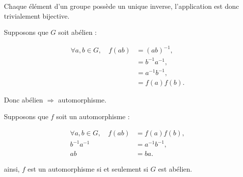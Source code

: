 Chaque élément d'un groupe possède un unique inverse, l'application est donc trivialement bijective.

Supposons que $G$ soit abélien :

\begin{align*}
    \forall a,b \in G,\quad f(ab) &= (ab)^{-1}, \\
    &= b^{-1} a^{-1}, \\
    &= a^{-1} b^{-1}, \\
    &= f(a)f(b).
\end{align*}

Donc abélien $\Rightarrow$ automorphisme.

Supposons que $f$ soit un automorphisme :

\begin{align*}
    \forall a,b \in G,\quad f(ab)&=f(a)f(b), \\
    b^{-1}a^{-1} &= a^{-1}b^{-1}, \\
    ab &= ba.
\end{align*}

ainsi, $f$ est un automorphisme si et seulement si $G$ est abélien.